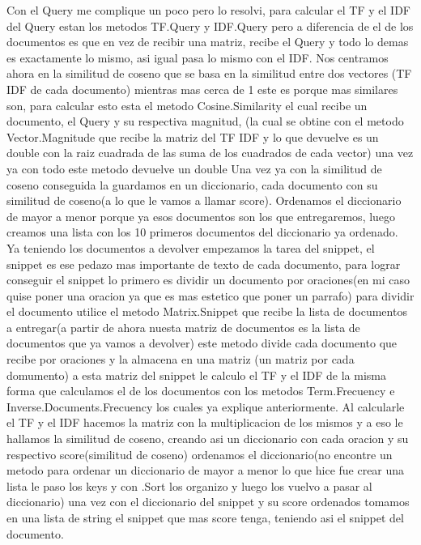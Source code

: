 \documentclass[12pt,a4paper]{article}
\begin{document}
\newline
Con el Query me complique un poco pero lo resolvi, para calcular el TF y el IDF del Query estan los metodos TF.Query y IDF.Query pero a diferencia de el de los documentos es que en vez de recibir una matriz, recibe el Query y todo lo demas es exactamente lo mismo, asi igual pasa lo mismo con el IDF.
\newline
Nos centramos ahora en la similitud de coseno  que se basa en la similitud entre dos vectores (TF IDF de cada documento) mientras mas cerca de 1 este  es porque mas similares  son, para calcular esto esta el metodo Cosine.Similarity el cual recibe un documento, el Query y su respectiva magnitud, (la cual se obtine con el metodo Vector.Magnitude que recibe la matriz del TF IDF  y lo que devuelve es un double con la raiz cuadrada de las suma de los cuadrados de cada vector) una vez ya con todo este metodo devuelve un double
\newline
Una vez ya con la similitud de coseno conseguida la guardamos en un diccionario, cada documento con su similitud de coseno(a lo que le vamos a llamar score). Ordenamos el diccionario de mayor a menor porque ya esos documentos son los que entregaremos, luego creamos una lista con los 10 primeros documentos del diccionario ya ordenado. 
Ya teniendo los documentos a devolver  empezamos la tarea del snippet, el snippet es ese pedazo mas importante de texto de cada documento,  para lograr conseguir el snippet lo primero es dividir un documento por oraciones(en mi caso quise poner  una oracion ya que es mas estetico que poner un parrafo) para dividir el documento utilice el metodo Matrix.Snippet que recibe la lista de documentos a entregar(a partir de ahora nuesta matriz de documentos es la lista de documentos que ya vamos a devolver) este metodo divide cada documento que recibe por oraciones y la almacena en una matriz (un matriz por cada domumento)  a esta matriz del snippet le calculo el TF y el IDF de la misma forma que calculamos el de los documentos con los metodos Term.Frecuency e Inverse.Documents.Frecuency los cuales ya explique anteriormente. Al calcularle el TF y el IDF  hacemos la matriz con la multiplicacion de los mismos y a eso le hallamos la similitud de coseno,  creando asi un diccionario con cada oracion y su respectivo score(similitud de coseno) ordenamos el diccionario(no encontre un metodo para ordenar un diccionario de mayor a menor lo que hice fue crear una lista  le paso los keys y con .Sort los organizo y luego los vuelvo a pasar al diccionario) una vez con el diccionario del snippet y su score ordenados tomamos en una lista de string el snippet que mas score tenga, teniendo asi el snippet del documento.
\end{document}
